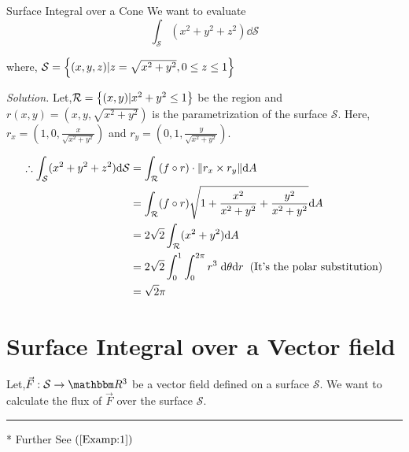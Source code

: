 \documentclass[../Analysis-3]{subfiles}
\begin{document}
\begin{Eg}{Surface Integral over a Cone}{}
We want to evaluate \[ \int_{\mathcal{S}}(x^2+y^2+z^2) \dd \mathcal{S}\]    

where, $\mathcal{S} = \qty{(x,y,z) | z = \sqrt{x^2 + y^2},0 \le z \le 1}$

\textit{Solution.} Let,$\mathcal{R} = \qty{(x,y)| x^2+y^2 \le 1}$ be the region and $r(x,y) = (x,y,\sqrt{x^2+y^2})$ is the parametrization of the surface $\mathcal{S}$. Here, $r_x = (1,0, \frac{x}{\sqrt{x^2+y^2}})$ and $r_y = (0,1,\frac{y}{\sqrt{x^2+y^2}})$.


\begin{align*}
    \therefore \int_{\mathcal{S}}(x^2+y^2+z^2) \dd \mathcal{S} &= \int_{\mathcal{R}} (f\circ r) \cdot \norm{r_x \times r_y} \dd A \\
    &= \int_{\mathcal{R}} (f\circ r) \sqrt{1 + \frac{x^2}{x^2+y^2} + \frac{y^2}{x^2+y^2}} \dd A \\
    &= 2\sqrt{2} \int_{\mathcal{R}} (x^2+y^2) \dd A \\
    &= 2\sqrt{2} \int_{0}^{1} \int_{0}^{2\pi} r^3 \hspace{0.1cm} \dd \theta \dd r \hspace{0.2cm} (\text{It's the polar substitution})\\
    &= \sqrt{2} \pi 
\end{align*}

\end{Eg}

\section{Surface Integral over a Vector field}

Let,$\vec{F} : \mathcal{S} \to \R^3$ be a vector field defined on a surface $\mathcal{S}$. We want to calculate the flux of $\vec{F}$ over the surface $\mathcal{S}$.

\vspace{0.2cm}

\hrule

\vspace{0.2cm}
* Further See $(\ref{Examp:1})$ 

\pagebreak
\end{document}
